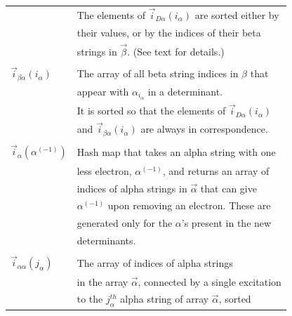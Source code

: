 \documentclass[%
preprint,
 superscriptaddress,
 amsmath,amssymb,
 aps,
]{revtex4-1}
\def\V{\mathcal{V}}
\def\veca{\vec{\alpha}}
\def\vecb{\vec{\beta}}
\def\ia{i_\alpha}
\def\ib{i_\beta}
\def\vecia{\vec{i}_\alpha}
\def\veciDa{\vec{i}_{D\alpha}}
\def\veciaa{\vec{i}_{\alpha\alpha}}
\def\veciba{\vec{i}_{\beta\alpha}}
\begin{document}
\begin{table}[h]
\begin{tabular}{ll}
& The elements of $\veciDa(\ia)$ are sorted either by\\
& their values, or by the indices of their beta \\
& strings in $\vecb$. (See text for details.)\\
&\\
$\veciba(\ia)$ & The array of all beta string indices in $\beta$ that\\
& appear with $\alpha_{\ia}$ in a determinant. \\
& It is sorted so that the elements of $\veciDa(\ia)$ \\
& and $\veciba(\ia)$ are always in correspondence.\\
&\\
$\vecia(\alpha^{(-1)})$ & Hash map that takes an alpha string with one \\
& less electron, $\alpha^{(-1)}$, and returns an array of  \\
& indices of alpha strings in $\veca$ that can give  \\
& $\alpha^{(-1)}$ upon removing an electron.  These are \\
& generated only for the $\alpha$'s present in the new \\
& determinants.\\
&\\
$\veciaa(j_\alpha)$ & The array of indices of alpha strings \\
& in the array $\veca$, connected by a single excitation \\
& to the $j_\alpha^{th}$ alpha string of array $\veca$, sorted \\

\end{tabular}
\end{table}
\end{document}
